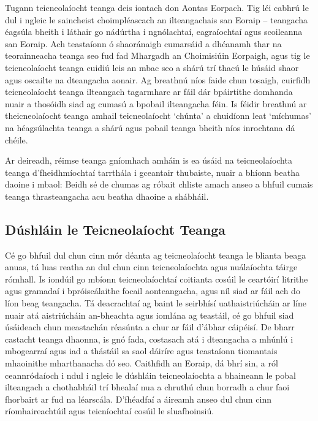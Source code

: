 \begin{multicols}{2}

Tugann teicneolaíocht teanga deis iontach don Aontas Eorpach. Tig léi cabhrú le dul i ngleic le saincheist choimpléascach an ilteangachais san Eoraip – teangacha éagsúla bheith i láthair go nádúrtha i ngnólachtaí, eagraíochtaí agus scoileanna san Eoraip. Ach teastaíonn ó shaoránaigh cumarsáid a dhéanamh thar na teorainneacha teanga seo fud fad Mhargadh an Choimisiúin Eorpaigh, agus tig le teicneolaíocht teanga cuidiú leis an mbac seo a shárú trí thacú le húsáid shaor agus oscailte na dteangacha aonair. Ag breathnú níos faide chun tosaigh, cuirfidh teicneolaíocht teanga ilteangach tagarmharc ar fáil dár bpáirtithe domhanda nuair a thosóidh siad ag cumasú a bpobail ilteangacha féin. Is féidir breathnú ar theicneolaíocht teanga amhail teicneolaíocht ‘chúnta’ a chuidíonn leat ‘míchumas’ na héagsúlachta teanga a shárú agus pobail teanga bheith níos inrochtana dá chéile.

Ar deireadh, réimse teanga gníomhach amháin is ea úsáid na teicneolaíochta teanga d’fheidhmíochtaí tarrthála i gceantair thubaiste, nuair a bhíonn beatha daoine i mbaol: Beidh sé de chumas ag róbait chliste amach anseo a bhfuil cumais teanga thrasteangacha acu beatha dhaoine a shábháil.

\subsection{Dúshláin le Teicneolaíocht Teanga}

Cé go bhfuil dul chun cinn mór déanta ag teicneolaíocht teanga le blianta beaga anuas, tá luas reatha an dul chun cinn teicneolaíochta agus nuálaíochta táirge rómhall. Is iondúil go mbíonn teicneolaíochtaí coitianta cosúil le ceartóirí litrithe agus gramadaí i bpróiseálaithe focail aonteangacha, agus níl siad ar fáil ach do líon beag teangacha. Tá deacrachtaí ag baint le seirbhísí uathaistriúcháin ar líne nuair atá aistriúcháin an-bheachta agus iomlána ag teastáil, cé go bhfuil siad úsáideach chun meastachán réasúnta a chur ar fáil d’ábhar cáipéisí. De bharr castacht teanga dhaonna, is gnó fada, costasach atá i dteangacha a mhúnlú i mbogearraí agus iad a thástáil sa saol dáiríre agus teastaíonn tiomantais mhaoinithe mharthanacha dó seo. Caithfidh an Eoraip, dá bhrí sin, a ról ceannródaíoch i ndul i ngleic le dúshláin teicneolaíochta a bhaineann le pobal ilteangach a chothabháil trí bhealaí nua a chruthú chun borradh a chur faoi fhorbairt ar fud na léarscála. D’fhéadfaí a áireamh anseo dul chun cinn ríomhaireachtúil agus teicníochtaí cosúil le sluafhoinsiú.


\end{multicols}
